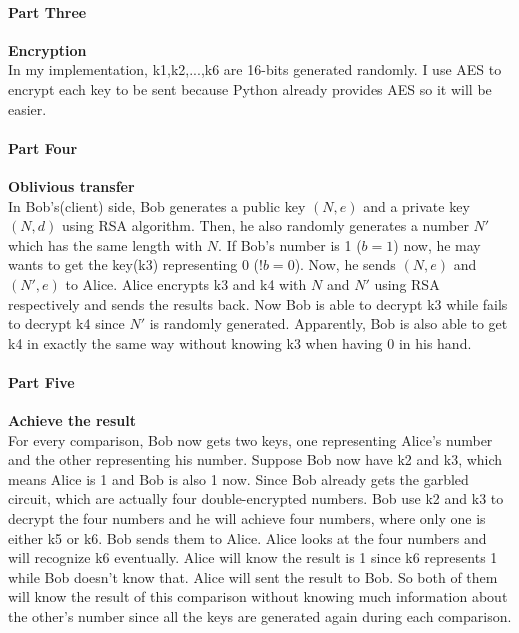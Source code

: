 \documentclass[11pt]{article}
\begin{document}
\paragraph{Part Three}{\textbf{Encryption}}\vspace{2ex}\\
In my implementation, k1,k2,...,k6 are 16-bits generated randomly. I use AES to encrypt each key to be sent because Python already provides AES so it will be easier.
\paragraph{Part Four}{\textbf{Oblivious transfer}}\vspace{2ex}\\
In Bob's(client) side, Bob generates a public key $(N,e)$ and a private key $(N,d)$ using RSA algorithm. Then, he also randomly generates a number $N'$ which has the same length with $N$. If Bob's number is 1 ($b = 1$) now, he may wants to get the key(k3) representing 0 ($!b = 0$). Now, he sends $(N,e)$ and $(N',e)$ to Alice. Alice encrypts k3 and k4 with $N$ and $N'$ using RSA respectively and sends the results back. Now Bob is able to decrypt k3 while fails to decrypt k4 since $N'$ is randomly generated. Apparently, Bob is also able to get k4 in exactly the same way without knowing k3 when having 0 in his hand.
\paragraph{Part Five}{\textbf{Achieve the result}}\vspace{2ex}\\
For every comparison, Bob now gets two keys, one representing Alice's number and the other representing his number. Suppose Bob now have k2 and k3, which means Alice is 1 and Bob is also 1 now. Since Bob already gets the garbled circuit, which are actually four double-encrypted numbers. Bob use k2 and k3 to decrypt the four numbers and he will achieve four numbers, where only one is either k5 or k6. Bob sends them to Alice. Alice looks at the four numbers and will recognize k6 eventually. Alice will know the result is 1 since k6 represents 1 while Bob doesn't know that. Alice will sent the result to Bob. So both of them will know the result of this comparison without knowing much information about the other's number since all the keys are generated again during each comparison.
\end{document}
